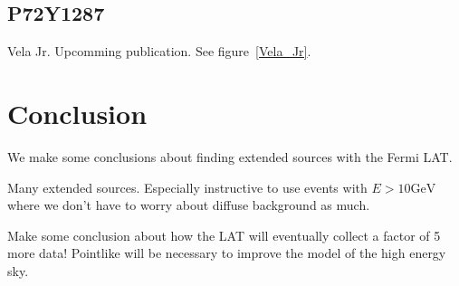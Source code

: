 \documentclass[preprint]{aastex}
\newcommand{\gev}{\text{GeV}\xspace}
\begin{document}
\subsection{P72Y1287}

Vela Jr. Upcomming publication.
See figure~\ref{Vela_Jr}.

\section{Conclusion}

We make some conclusions about finding extended
sources with the Fermi LAT.

Many extended sources. Especially instructive to
use events with $E>10\gev$ where we don't have
to worry about diffuse background as much.

Make some conclusion about how the LAT will eventually collect a factor
of 5 more data! Pointlike will be necessary to improve the model of the
high energy sky.




\appendix
\end{document}
